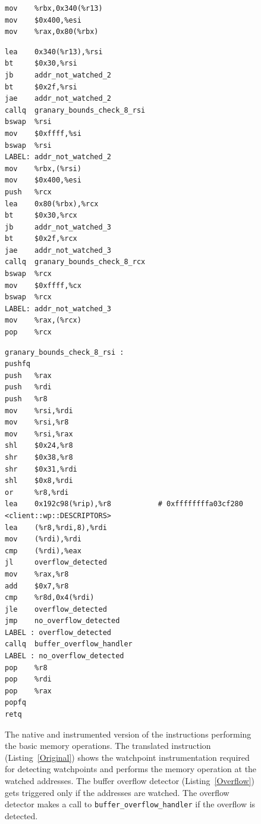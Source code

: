 \begin{figure}
\begin{multicols}{2}
\lstset{language=[x64]Assembler, numbers=left, label=Original}
\begin{lstlisting}[basicstyle=\footnotesize\ttfamily, caption=Original instructions]
mov    %rbx,0x340(%r13)
mov    $0x400,%esi
mov    %rax,0x80(%rbx)
\end{lstlisting}
\lstset{language=[x64]Assembler, numbers=left}
\begin{lstlisting}[basicstyle=\footnotesize\ttfamily, caption=Translated instructions]
lea    0x340(%r13),%rsi
bt     $0x30,%rsi
jb     addr_not_watched_2
bt     $0x2f,%rsi
jae    addr_not_watched_2
callq  granary_bounds_check_8_rsi
bswap  %rsi
mov    $0xffff,%si
bswap  %rsi
LABEL: addr_not_watched_2
mov    %rbx,(%rsi)
mov    $0x400,%esi
push   %rcx
lea    0x80(%rbx),%rcx
bt     $0x30,%rcx
jb     addr_not_watched_3
bt     $0x2f,%rcx
jae    addr_not_watched_3
callq  granary_bounds_check_8_rcx
bswap  %rcx
mov    $0xffff,%cx
bswap  %rcx
LABEL: addr_not_watched_3
mov    %rax,(%rcx)
pop    %rcx
\end{lstlisting}
\label{fig:translated}
\columnbreak
\lstset{language=[x64]Assembler, numbers=left,  label=Overflow}
\begin{lstlisting}[basicstyle=\footnotesize\ttfamily, caption=Overflow detector]
granary_bounds_check_8_rsi :
pushfq 
push   %rax
push   %rdi
push   %r8
mov    %rsi,%rdi
mov    %rsi,%r8
mov    %rsi,%rax
shl    $0x24,%r8
shr    $0x38,%r8
shr    $0x31,%rdi
shl    $0x8,%rdi
or     %r8,%rdi
lea    0x192c98(%rip),%r8   		# 0xffffffffa03cf280 <client::wp::DESCRIPTORS>
lea    (%r8,%rdi,8),%rdi
mov    (%rdi),%rdi
cmp    (%rdi),%eax
jl     overflow_detected
mov    %rax,%r8
add    $0x7,%r8
cmp    %r8d,0x4(%rdi)
jle    overflow_detected
jmp    no_overflow_detected
LABEL : overflow_detected
callq  buffer_overflow_handler
LABEL : no_overflow_detected
pop    %r8
pop    %rdi
pop    %rax
popfq  
retq  
\end{lstlisting}
\end{multicols}
\caption[The baseline watchpoint instrumentation and the instrumentation for buffer overflow detector.]{The native and instrumented version of the instructions performing the basic memory operations. The translated instruction (Listing~\ref{Original}) shows the watchpoint instrumentation required for detecting watchpoints and performs the memory operation at the watched addresses. The buffer overflow detector (Listing~\ref{Overflow}) gets triggered only if the addresses are watched. The overflow detector makes a call to \texttt{buffer\_overflow\_handler} if the overflow is detected. %
}
\label{fig:mem-write}
\end{figure}


